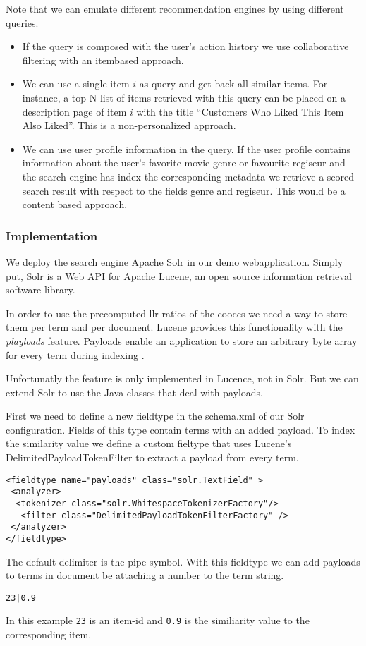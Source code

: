 Note that we can emulate different recommendation engines by using different queries.
\begin{itemize}
\item If the query is composed with the user's action history we use collaborative filtering with an itembased approach.
\item We can use a single item $i$ as query and get back all similar items. For instance, a top-N list of items retrieved with this query can be placed on a description page of item $i$ with the title ``Customers Who Liked This Item Also Liked''. This is a non-personalized approach.
\item We can use user profile information in the query. If the user profile contains information about the user's favorite movie genre or favourite regiseur and the search engine has index the corresponding metadata we retrieve a scored search result with respect to the fields genre and regiseur. This would be a content based approach.
\end{itemize}

\subsubsection{Implementation}
\label{sec:solrimpl}
We deploy the search engine Apache Solr in our demo webapplication. Simply put, Solr is a Web API for Apache Lucene, an open source information retrieval software library. 

In order to use the precomputed \gls{llr} ratios of the \glspl{coocc} we need a way to store them per term and per document. Lucene provides this functionality with the \emph{playloads} feature. Payloads enable an application to store an arbitrary byte array for every term during indexing \cite{McCandless}.

Unfortunatly the feature is only implemented in Lucence, not in Solr. But we can extend Solr to use the Java classes that deal with payloads.

First we need to define a new fieldtype in the schema.xml of our Solr configuration. Fields of this type contain terms with an added payload.
To index the similarity value we define a custom fieltype that uses Lucene's DelimitedPayloadTokenFilter to extract a payload from every term. 

\begin{lstlisting}[caption={Fieldtype definition for field with payload.}]
<fieldtype name="payloads" class="solr.TextField" >
 <analyzer>
  <tokenizer class="solr.WhitespaceTokenizerFactory"/>
   <filter class="DelimitedPayloadTokenFilterFactory" />
 </analyzer>
</fieldtype>
\end{lstlisting}
The default delimiter is the pipe symbol. With this fieldtype we can add payloads to terms in document be attaching a number to the term string.
\begin{verbatim}
23|0.9
\end{verbatim}
In this example \verb|23| is an item-id and \verb|0.9| is the similiarity value to the corresponding item.

